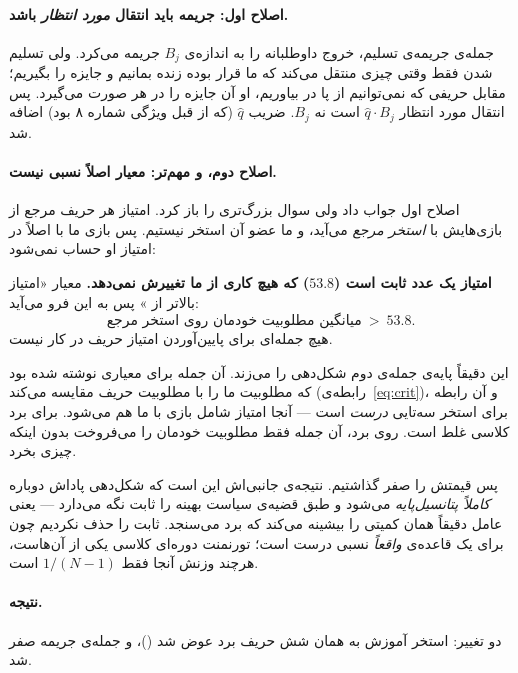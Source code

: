 \documentclass[12pt,a4paper]{article}
\begin{document}
\paragraph{اصلاح اول: جریمه باید انتقال \emph{مورد انتظار} باشد.}
جمله‌ی جریمه‌ی تسلیم، خروج داوطلبانه را به اندازه‌ی $B_j$ جریمه می‌کرد.
ولی تسلیم شدن فقط وقتی چیزی منتقل می‌کند که ما قرار بوده زنده بمانیم و
جایزه را بگیریم؛ مقابل حریفی که نمی‌توانیم از پا در بیاوریم، او آن جایزه
را در هر صورت می‌گیرد. پس انتقال مورد انتظار $\hat q\cdot B_j$ است نه
$B_j$. ضریب $\hat q$ (که از قبل ویژگی شماره ۸ بود) اضافه شد.

\paragraph{اصلاح دوم، و مهم‌تر: معیار اصلاً نسبی نیست.}
اصلاح اول جواب داد ولی سوال بزرگ‌تری را باز کرد. امتیاز هر حریف مرجع از
بازی‌هایش با \emph{استخر مرجع} می‌آید، و ما عضو آن استخر نیستیم. پس
بازی ما با  اصلاً در امتیاز او حساب نمی‌شود:

\begin{keybox}
\textbf{امتیاز  یک عدد ثابت است ($53.8$) که هیچ کاری از ما
تغییرش نمی‌دهد.} معیار «امتیاز بالاتر از » پس به این
فرو‌ می‌آید:
\[
  \text{میانگین مطلوبیت خودمان روی استخر مرجع}\ >\ 53.8 .
\]
هیچ جمله‌ای برای پایین‌آوردن امتیاز حریف در کار نیست.
\end{keybox}

این دقیقاً پایه‌ی جمله‌ی دوم شکل‌دهی را می‌زند. آن جمله برای معیاری نوشته
شده بود که مطلوبیت ما را با مطلوبیت حریف مقایسه می‌کند
(رابطه‌ی~\eqref{eq:crit})، و آن رابطه برای استخر سه‌تایی
 \emph{درست} است — آنجا امتیاز  شامل بازی
با ما هم می‌شود. برای برد کلاسی غلط است. روی برد، آن جمله فقط مطلوبیت
خودمان را می‌فروخت بدون اینکه چیزی بخرد.

پس قیمتش را صفر گذاشتیم. نتیجه‌ی جانبی‌اش این است که شکل‌دهی پاداش دوباره
\emph{کاملاً پتانسیل‌پایه} می‌شود و طبق قضیه‌ی
 سیاست بهینه را ثابت نگه می‌دارد — یعنی عامل
دقیقاً همان کمیتی را بیشینه می‌کند که برد می‌سنجد. ثابت
 را حذف نکردیم چون برای یک قاعده‌ی \emph{واقعاً} نسبی
درست است؛ تورنمنت دوره‌ای کلاسی یکی از آن‌هاست، هرچند وزنش آنجا فقط
$1/(N-1)$ است.

\paragraph{نتیجه.}
دو تغییر: استخر آموزش به همان شش حریف برد عوض شد
()، و جمله‌ی جریمه صفر شد.
\end{document}
